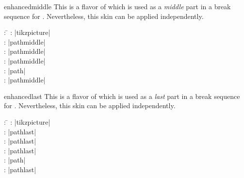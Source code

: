\begin{dispExample}
\end{dispExample}

\medskip

\begin{docSkin}{enhancedmiddle}
This is a flavor of  which is used as a \emph{middle} part
in a break sequence for .
Nevertheless, this skin can be applied independently.
\begin{tcolorbox}[skintable=enhancedmiddle]
  \begin{tabbing}
    : \=\kill
    :  \> |tikzpicture|\\ 
    :           \> |pathmiddle|\\
    : \> |pathmiddle|\\ 
    :        \> |pathmiddle|\\
    :    \> |path|\\
    :           \> |pathmiddle|
  \end{tabbing}
\end{tcolorbox}
\end{docSkin}


\begin{dispExample}
\end{dispExample}


\clearpage
\begin{docSkin}{enhancedlast}
This is a flavor of  which is used as a \emph{last} part
in a break sequence for .
Nevertheless, this skin can be applied independently.
\begin{tcolorbox}[skintable=enhancedlast]
  \begin{tabbing}
    : \=\kill
    :  \> |tikzpicture|\\ 
    :           \> |pathlast|\\
    : \> |pathlast|\\ 
    :        \> |pathlast|\\
    :    \> |path|\\
    :           \> |pathlast|
  \end{tabbing}
\end{tcolorbox}
\end{docSkin}

